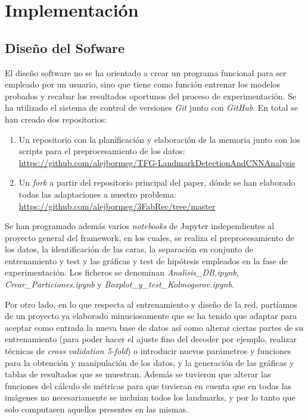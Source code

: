 \chapter{Implementación}

\section{Diseño del Sofware}

\noindent El diseño software no se ha orientado a crear un programa funcional para ser empleado por un usuario, sino que tiene como función entrenar los modelos probados y recabar los resultados oportunos del proceso de experimentación. Se ha utilizado el sistema de control de versiones \textit{Git} junto con \textit{GitHub}. En total se han creado dos repositorios:

\begin{enumerate}
    \item Un repositorio con la planificación y elaboración de la memoria junto con los scripts para el preprocesamiento de los datos: \url{https://github.com/alejbormeg/TFG-LandmarkDetectionAndCNNAnalysis}
    \item Un \textit{fork} a partir del repositorio principal del paper, dónde se han elaborado todas las adaptaciones a nuestro problema: \url{https://github.com/alejbormeg/3FabRec/tree/master}
\end{enumerate}

\medskip

\noindent Se han programado además varios \textit{notebooks} de Jupyter independientes al proyecto general del framework, en los cuales, se realiza el preprocesamiento de los datos, la identificación de las caras, la separación en conjunto de entrenamiento y test y las gráficas y test de hipótesis empleados en la fase de experimentación. Los ficheros se denominan \textit{Analisis\_DB.ipynb}, \textit{Crear\_Particiones.ipynb} y \textit{Boxplot\_y\_test\_Kolmogorov.ipynb}.

\medskip

\noindent Por otro lado, en lo que respecta al entrenamiento y diseño de la red, partíamos de un proyecto ya elaborado minuciosamente que se ha tenido que adaptar para aceptar como entrada la nueva base de datos así como alterar ciertas partes de su entrenamiento (para poder hacer el ajuste fino del decoder por ejemplo, realizar técnicas de \textit{cross validation 5-fold}) o introducir nuevos parámetros y funciones para la obtención y manipulación de los datos, y la generación de las gráficas y tablas de resultados que se muestran. Además se tuvieron que alterar las funciones del cálculo de métricas para que tuvieran en cuenta que en todas las imágenes no necesariamente se incluían todos los landmarks, y por lo tanto que solo computasen aquellos presentes en las mismas.

